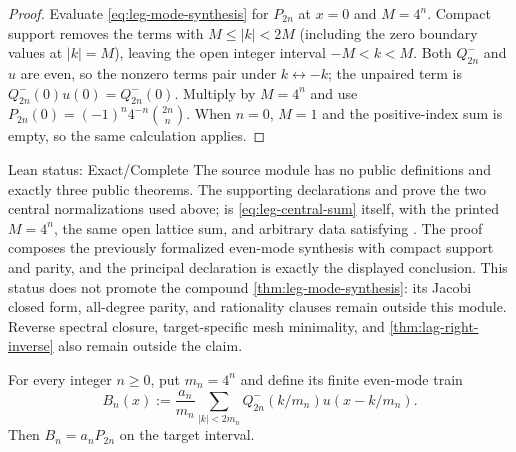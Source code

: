 {\begin{proof}
Evaluate \eqref{eq:leg-mode-synthesis} for $P_{2n}$ at $x=0$ and
$M=4^n$.  Compact support removes the terms with
$M\le \lvert k\rvert<2M$ (including the zero boundary values at
$\lvert k\rvert=M$), leaving the open integer
interval $-M<k<M$.  Both $Q^-_{2n}$ and $u$ are even, so the nonzero terms
pair under $k\leftrightarrow-k$; the unpaired term is
$Q^-_{2n}(0)u(0)=Q^-_{2n}(0)$.  Multiply by $M=4^n$ and use
$P_{2n}(0)=(-1)^n4^{-n}\binom{2n}{n}$.  When $n=0$, $M=1$ and the
positive-index sum is empty, so the same calculation applies.
\end{proof}

\begin{statusbox}{Lean status: Exact/Complete}
The source module  has no public
definitions and exactly three public theorems.  The supporting declarations
 and
 prove the two central
normalizations used above;  is
\eqref{eq:leg-central-sum} itself, with the printed $M=4^n$, the same open
lattice sum, and arbitrary  data satisfying
.  The proof composes the previously formalized even-mode
synthesis with compact support and parity, and the principal declaration is
exactly the displayed conclusion.  This status does not promote the
compound \cref{thm:leg-mode-synthesis}: its Jacobi closed form, all-degree
parity, and rationality clauses remain outside this module.  Reverse spectral
closure, target-specific mesh minimality, and \cref{thm:lag-right-inverse}
also remain outside the claim.
\end{statusbox}
}

For every integer $n\ge0$, put $m_n=4^n$ and define its finite even-mode train
\begin{equation}
 B_n(x):=\frac{a_n}{m_n}
 \sum_{|k|<2m_n}Q_{2n}^-(k/m_n)u(x-k/m_n).
 \label{eq:leg-block}
\end{equation}
Then $B_n=a_nP_{2n}$ on the target interval.

